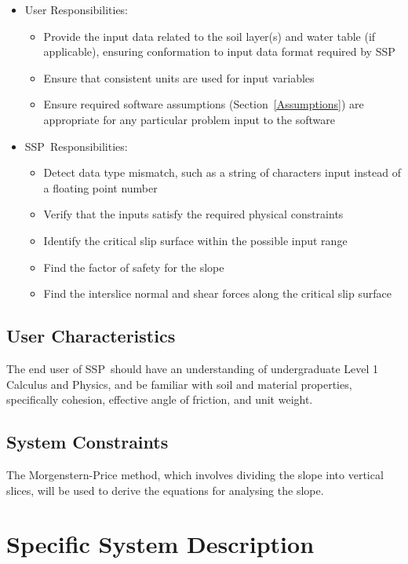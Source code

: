 \documentclass[12pt]{article}
\newcommand{\progname}{SSP}
\begin{document}
\begin{itemize}
\item User Responsibilities:
  \begin{itemize}
  \item Provide the input data related to the soil layer(s) and water table (if 
  applicable), ensuring conformation to input data format required by \progname
  \item Ensure that consistent units are used for input variables
  \item Ensure required software assumptions (Section~\ref{Assumptions}) are
    appropriate for any particular problem input to the software
  \end{itemize}
\item \progname\ Responsibilities:
  \begin{itemize}
  \item Detect data type mismatch, such as a string of characters input instead
    of a floating point number
  \item Verify that the inputs satisfy the required physical constraints
  \item Identify the critical slip surface within the possible input range
  \item Find the factor of safety for the slope
  \item Find the interslice normal and shear forces along the critical slip 
  surface
  \end{itemize}
\end{itemize}

\subsection{User Characteristics}
\label{Sec:UserChar}
The end user of \progname\ should have an understanding of undergraduate
Level 1 Calculus and Physics, and be familiar with soil and material
properties, specifically cohesion, effective angle of 
friction, and unit weight.

\subsection{System Constraints}

The Morgenstern-Price method, which involves dividing the slope into vertical 
slices, will be used to derive the equations for analysing the slope. 

\section{Specific System Description}
\end{document}
